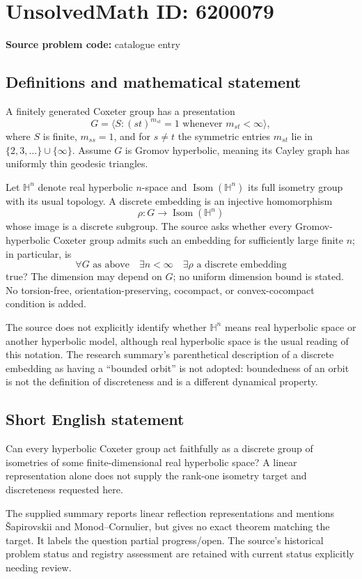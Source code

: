 \documentclass[11pt]{article}
\begin{document}
\section*{UnsolvedMath ID: 6200079}
\textbf{Source problem code:} catalogue entry
\subsection{Definitions and mathematical statement}
A finitely generated Coxeter group has a presentation
\[
 G=\langle S:(st)^{m_{st}}=1\text{ whenever }m_{st}<\infty\rangle,
\]
where $S$ is finite, $m_{ss}=1$, and for $s\ne t$ the symmetric entries $m_{st}$ lie in $\{2,3,\ldots\}\cup\{\infty\}$. Assume $G$ is Gromov hyperbolic, meaning its Cayley graph has uniformly thin geodesic triangles.

Let $\mathbb H^n$ denote real hyperbolic $n$-space and $\operatorname{Isom}(\mathbb H^n)$ its full isometry group with its usual topology. A discrete embedding is an injective homomorphism
\[
 \rho:G\longrightarrow\operatorname{Isom}(\mathbb H^n)
\]
whose image is a discrete subgroup. The source asks whether every Gromov-hyperbolic Coxeter group admits such an embedding for sufficiently large finite $n$; in particular, is
\[
 \forall G\text{ as above}\quad\exists n<\infty\quad
 \exists\rho\text{ a discrete embedding}
\]
true? The dimension may depend on $G$; no uniform dimension bound is stated. No torsion-free, orientation-preserving, cocompact, or convex-cocompact condition is added.

The source does not explicitly identify whether $\mathbb H^n$ means real hyperbolic space or another hyperbolic model, although real hyperbolic space is the usual reading of this notation. The research summary's parenthetical description of a discrete embedding as having a ``bounded orbit'' is not adopted: boundedness of an orbit is not the definition of discreteness and is a different dynamical property.
\subsection{Short English statement}
Can every hyperbolic Coxeter group act faithfully as a discrete group of isometries of some finite-dimensional real hyperbolic space? A linear representation alone does not supply the rank-one isometry target and discreteness requested here.

The supplied summary reports linear reflection representations and mentions Šapirovskii and Monod--Cornulier, but gives no exact theorem matching the target. It labels the question partial progress/open. The source's historical problem status and registry assessment are retained with current status explicitly needing review.
\end{document}
